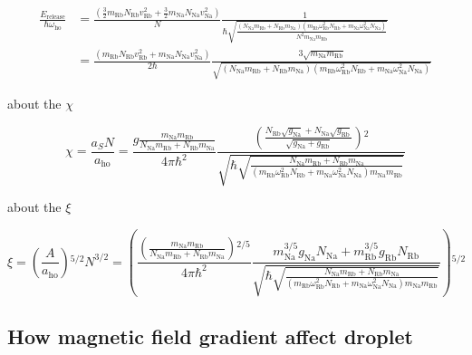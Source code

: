 \begin{equation}
\begin{split}
\frac{E_{\text{release}}}{\hbar\omega_{\text{ho}}}&=\frac{\left(\frac{3}{2}m_{\text{Rb}}N_{\text{Rb}}v_{\text{Rb}}^2+\frac{3}{2}m_{\text{Na}}N_{\text{Na}}v_{\text{Na}}^2\right)}{N}\frac{1}{\hbar\sqrt{\frac{\left(N_{\text{Na}}m_{\text{Rb}}+N_{\text{Rb}}m_{\text{Na}}\right)\left(m_{\text{Rb}}\omega _{\text{Rb}}^2N_{\text{Rb}}+m_{\text{Na}} \omega _{\text{Na}}^2N_{\text{Na}}\right)}{N^2m_{\text{Na}}m_{\text{Rb}}}}}\\
&=\frac{\left(m_{\text{Rb}}N_{\text{Rb}}v_{\text{Rb}}^2+m_{\text{Na}}N_{\text{Na}}v_{\text{Na}}^2\right)}{2\hbar}\frac{3\sqrt{m_{\text{Na}}m_{\text{Rb}}}}{\sqrt{\left(N_{\text{Na}}m_{\text{Rb}}+N_{\text{Rb}}m_{\text{Na}}\right)\left(m_{\text{Rb}}\omega_{\text{Rb}}^2N_{\text{Rb}}+m_{\text{Na}}\omega _{\text{Na}}^2N_{\text{Na}}\right)}}
\end{split}
\end{equation}

about the $\chi $

\begin{equation}\chi =\frac{a_SN}{a_{\text{ho}}}=\frac{g \frac{m_{\text{Na}}m_{\text{Rb}}}{N_{\text{Na}}m_{\text{Rb}}+N_{\text{Rb}}m_{\text{Na}}}}{4\pi  \hbar
^2}\frac{\left(\frac{N_{\text{Rb}}\sqrt{g_{\text{Na}}}+N_{\text{Na}}\sqrt{g_{\text{Rb}}}}{\sqrt{g_{\text{Na}}+g_{\text{Rb}}}}\right){}^2}{\sqrt{\hbar
\sqrt{\frac{N_{\text{Na}}m_{\text{Rb}}+N_{\text{Rb}}m_{\text{Na}}}{\left(m_{\text{Rb}} \omega _{\text{Rb}}^2N_{\text{Rb}}+m_{\text{Na}} \omega _{\text{Na}}^2N_{\text{Na}}\right)m_{\text{Na}}m_{\text{Rb}}}}}}\end{equation}

about the $\xi $

\begin{equation}\xi =\left(\frac{A}{a_{\text{ho}}}\right){}^{5/2}N^{3/2}=\left(\frac{\left(\frac{ m_{\text{Na}}m_{\text{Rb}}}{N_{\text{Na}}m_{\text{Rb}}+N_{\text{Rb}}m_{\text{Na}}}\right){}^{2/5}}{4\pi
 \hbar ^2}\frac{m_{\text{Na}}^{3/5}g_{\text{Na}}N_{\text{Na}}+m_{\text{Rb}}^{3/5}g_{\text{Rb}}N_{\text{Rb}}}{\sqrt{\hbar \sqrt{\frac{N_{\text{Na}}m_{\text{Rb}}+N_{\text{Rb}}m_{\text{Na}}}{\left(m_{\text{Rb}}
\omega _{\text{Rb}}^2N_{\text{Rb}}+m_{\text{Na}} \omega _{\text{Na}}^2N_{\text{Na}}\right)m_{\text{Na}}m_{\text{Rb}}}}}}\right){}^{5/2}\end{equation}

\subsection{How magnetic field gradient affect droplet}


